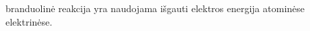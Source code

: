 \question \fillin[grandininė] branduolinė reakcija yra naudojama išgauti elektros energija atominėse elektrinėse.
